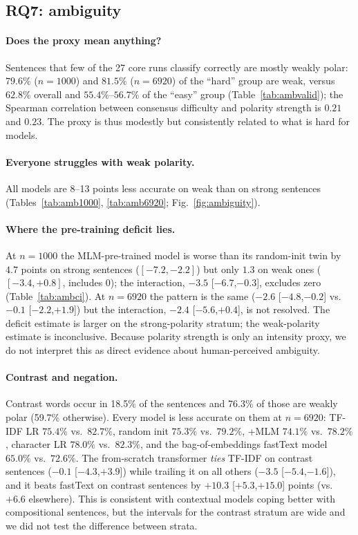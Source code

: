 \documentclass[11pt,a4paper]{article}
\begin{document}
\subsection{RQ7: ambiguity}\label{sec:ambiguity}
\paragraph{Does the proxy mean anything?} Sentences that few of the 27 core runs classify correctly are mostly weakly polar: $79.6\%$ ($n{=}1000$) and $81.5\%$ ($n{=}6920$) of the ``hard'' group are weak, versus $62.8\%$ overall and $55.4\%$--$56.7\%$ of the ``easy'' group (Table~\ref{tab:ambvalid}); the Spearman correlation between consensus difficulty and polarity strength is $0.21$ and $0.23$. The proxy is thus modestly but consistently related to what is hard for models.

\paragraph{Everyone struggles with weak polarity.} All models are 8--13 points less accurate on weak than on strong sentences (Tables~\ref{tab:amb1000}, \ref{tab:amb6920}; Fig.~\ref{fig:ambiguity}).

\paragraph{Where the pre-training deficit lies.} At $n{=}1000$ the MLM-pre-trained model is worse than its random-init twin by $4.7$ points on strong sentences ($[-7.2,-2.2]$) but only $1.3$ on weak ones ($[-3.4,+0.8]$, includes 0); the interaction, $-3.5$ [$-6.7$,$-0.3$], excludes zero (Table~\ref{tab:ambci}). At $n{=}6920$ the pattern is the same ($-2.6$ [$-4.8$,$-0.2$] vs.\ $-0.1$ [$-2.2$,$+1.9$]) but the interaction, $-2.4$ [$-5.6$,$+0.4$], is not resolved. The deficit estimate is larger on the strong-polarity stratum; the weak-polarity estimate is inconclusive. Because polarity strength is only an intensity proxy, we do not interpret this as direct evidence about human-perceived ambiguity.

\paragraph{Contrast and negation.} Contrast words occur in 18.5\% of the sentences and 76.3\% of those are weakly polar (59.7\% otherwise). Every model is less accurate on them at $n{=}6920$: TF-IDF LR $75.4\%$ vs.\ $82.7\%$, random init $75.3\%$ vs.\ $79.2\%$, +MLM $74.1\%$ vs.\ $78.2\%$, character LR $78.0\%$ vs.\ $82.3\%$, and the bag-of-embeddings fastText model $65.0\%$ vs.\ $72.6\%$.
The from-scratch transformer \emph{ties} TF-IDF on contrast sentences ($-0.1$ [$-4.3$,$+3.9$]) while trailing it on all others ($-3.5$ [$-5.4$,$-1.6$]), and it beats fastText on contrast sentences by $+10.3$ [$+5.3$,$+15.0$] points (vs.\ $+6.6$ elsewhere). This is consistent with contextual models coping better with compositional sentences, but the intervals for the contrast stratum are wide and we did not test the difference between strata.
\end{document}
